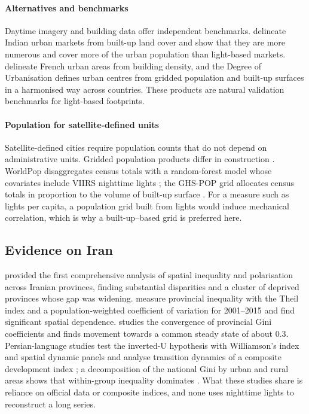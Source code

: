 \documentclass[11pt,a4paper]{article}
\begin{document}
\paragraph{Alternatives and benchmarks}
Daytime imagery and building data offer independent benchmarks. \citet{Baragwanath2021} delineate Indian urban markets from built-up land cover and show that they are more numerous and cover more of the urban population than light-based markets. \citet{deBellefon2021} delineate French urban areas from building density, and the Degree of Urbanisation \citep{Dijkstra2021} defines urban centres from gridded population and built-up surfaces in a harmonised way across countries. These products are natural validation benchmarks for light-based footprints.

\paragraph{Population for satellite-defined units}
Satellite-defined cities require population counts that do not depend on administrative units. Gridded population products differ in construction \citep{Leyk2019}. WorldPop disaggregates census totals with a random-forest model whose covariates include VIIRS nighttime lights \citep{Stevens2015}; the GHS-POP grid allocates census totals in proportion to the volume of built-up surface \citep{Schiavina2023,Pesaresi2024}. For a measure such as lights per capita, a population grid built from lights would induce mechanical correlation, which is why a built-up--based grid is preferred here.

\subsection{Evidence on Iran}

\citet{Noorbakhsh2005} provided the first comprehensive analysis of spatial inequality and polarisation across Iranian provinces, finding substantial disparities and a cluster of deprived provinces whose gap was widening. \citet{Pourfaraj2019} measure provincial inequality with the Theil index and a population-weighted coefficient of variation for 2001--2015 and find significant spatial dependence. \citet{Hadizadeh2020} studies the convergence of provincial Gini coefficients and finds movement towards a common steady state of about 0.3. Persian-language studies test the inverted-U hypothesis with Williamson's index and spatial dynamic panels \citep{DehghanShabani2019} and analyse transition dynamics of a composite development index \citep{Ahmadi2019}; a decomposition of the national Gini by urban and rural areas shows that within-group inequality dominates \citep{Abounoori2013}. What these studies share is reliance on official data or composite indices, and none uses nighttime lights to reconstruct a long series.
\end{document}
